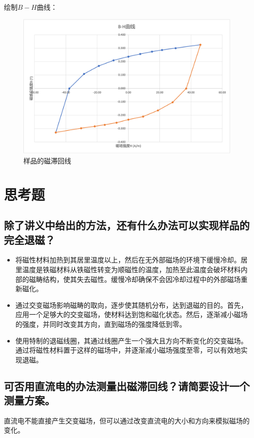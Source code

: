 \documentclass{article}
\begin{document}
绘制$B-H$曲线：
\begin{figure}[htbp]
    \centering
    \includegraphics[width=1.0\textwidth]{plot3.png}
    \caption{样品的磁滞回线}
\end{figure}

\newpage

\section{思考题}
\subsection{除了讲义中给出的方法，还有什么办法可以实现样品的完全退磁？}
\begin{itemize}
    \item 将磁性材料加热到其居里温度以上，然后在无外部磁场的环境下缓慢冷却。居里温度是铁磁材料从铁磁性转变为顺磁性的温度，加热至此温度会破坏材料内部的磁畴结构，使其失去磁性。缓慢冷却确保不会因冷却过程中的外部磁场重新磁化。
    \item 通过交变磁场影响磁畴的取向，逐步使其随机分布，达到退磁的目的。首先，应用一个足够大的交变磁场，使材料达到饱和磁化状态。然后，逐渐减小磁场的强度，并同时改变其方向，直到磁场的强度降低到零。
    \item 使用特制的退磁线圈，其通过线圈产生一个强大且方向不断变化的交变磁场。通过将磁性材料置于这样的磁场中，并逐渐减小磁场强度至零，可以有效地实现退磁。 
\end{itemize}

\subsection{可否用直流电的办法测量出磁滞回线？请简要设计一个测量方案。}
直流电不能直接产生交变磁场，但可以通过改变直流电的大小和方向来模拟磁场的变化。
\end{document}
